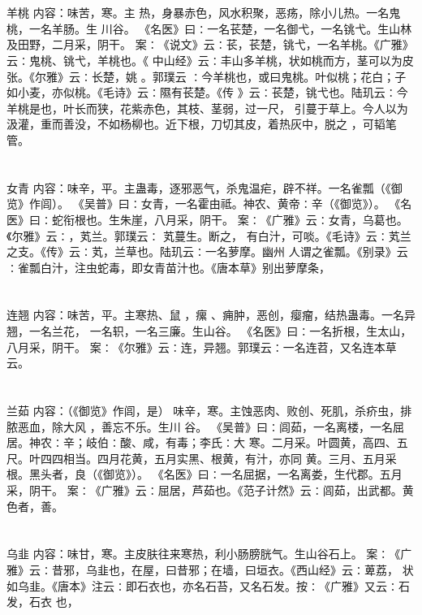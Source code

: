 \documentclass[12pt,UTF8]{ctexbook}
\begin{document}
\section{}羊桃
内容：味苦，寒。主 热，身暴赤色，风水积聚，恶疡，除小儿热。一名鬼桃，一名羊肠。生 
川谷。 
《名医》曰∶一名苌楚，一名御弋，一名铫弋。生山林及田野，二月采，阴干。 
案∶《说文》云∶苌，苌楚，铫弋，一名羊桃。《广雅》云∶鬼桃、铫弋，羊桃也。《 
中山经》云∶丰山多羊桃，状如桃而方，茎可以为皮张。《尔雅》云∶长楚，姚 。郭璞云 
∶今羊桃也，或曰鬼桃。叶似桃；花白；子如小麦，亦似桃。《毛诗》云∶隰有苌楚。《传 
》云∶苌楚，铫弋也。陆玑云∶今羊桃是也，叶长而狭，花紫赤色，其枝、茎弱，过一尺， 
引蔓于草上。今人以为汲灌，重而善没，不如杨柳也。近下根，刀切其皮，着热灰中，脱之 
，可韬笔管。 


\section{}女青
内容：味辛，平。主蛊毒，逐邪恶气，杀鬼温疟，辟不祥。一名雀瓢（《御览》作闾）。 
《吴普》曰∶女青，一名霍由祗。神农、黄帝∶辛（《御览》）。 
《名医》曰∶蛇衔根也。生朱崖，八月采，阴干。 
案∶《广雅》云∶女青，乌葛也。《尔雅》云∶，芄兰。郭璞云∶ 芄蔓生。断之， 
有白汁，可啖。《毛诗》云∶芄兰之支。《传》云∶芄，兰草也。陆玑云∶一名萝摩。幽州 
人谓之雀瓢。《别录》云∶雀瓢白汁，注虫蛇毒，即女青苗汁也。《唐本草》别出萝摩条， 


\section{}连翘
内容：味苦，平。主寒热、鼠 ，瘰 、痈肿，恶创，瘿瘤，结热蛊毒。一名异翘，一名兰花， 
一名轵，一名三廉。生山谷。 
《名医》曰∶一名折根，生太山，八月采，阴干。 
案∶《尔雅》云∶连，异翘。郭璞云∶一名连苕，又名连本草云。 


\section{}兰茹
内容：（《御览》作闾，是） 
味辛，寒。主蚀恶肉、败创、死肌，杀疥虫，排脓恶血，除大风 
，善忘不乐。生川 
谷。 
《吴普》曰∶闾茹，一名离楼，一名屈居。神农∶辛；岐伯∶酸、咸，有毒；李氏∶大 
寒。二月采。叶圆黄，高四、五尺。叶四四相当。四月花黄，五月实黑、根黄，有汁，亦同 
黄。三月、五月采根。黑头者，良（《御览》）。 
《名医》曰∶一名屈据，一名离娄，生代郡。五月采，阴干。 
案∶《广雅》云∶屈居，芦茹也。《范子计然》云∶闾茹，出武都。黄色者，善。 


\section{}乌韭
内容：味甘，寒。主皮肤往来寒热，利小肠膀胱气。生山谷石上。 
案∶《广雅》云∶昔邪，乌韭也，在屋，曰昔邪；在墙，曰垣衣。《西山经》云∶萆荔， 
状如乌韭。《唐本》注云∶即石衣也，亦名石苔，又名石发。按∶《广雅》又云∶石发，石衣 
也， 
\end{document}
